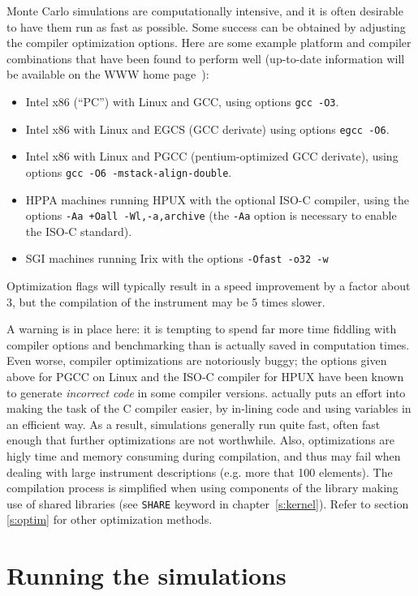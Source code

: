 Monte Carlo simulations are computationally intensive, and it is
often desirable to have them run as fast as possible. Some success can
be obtained by adjusting the compiler optimization
options. Here are some example platform and compiler combinations that
have been found to perform well (up-to-date information will be
available on the \MCS WWW home page~\cite{mcstas_webpage}):
\begin{itemize}
\item Intel x86 (``PC'') with Linux and GCC, using options \verb+gcc -O3+.
\item Intel x86 with Linux and EGCS (GCC derivate) using
  options \verb+egcc -O6+.
\item Intel x86 with Linux and PGCC (pentium-optimized GCC derivate), using
  options \verb+gcc -O6 -mstack-align-double+.
\item HPPA machines running HPUX with the optional ISO-C compiler,
  using the options
  \verb|-Aa +Oall -Wl,-a,archive| (the \verb+-Aa+ option is necessary to
  enable the ISO-C standard).
\item SGI machines running Irix with the options
  \verb|-Ofast -o32 -w|
\end{itemize}
Optimization flags will typically result in a speed improvement by a factor
about 3, but the compilation of the instrument may be 5 times slower.

A warning is in place here: it is tempting to spend far more time
fiddling with compiler options and benchmarking than is actually saved
in computation times. Even worse, compiler optimizations are notoriously
buggy; the options given above for PGCC on Linux and the ISO-C compiler
for HPUX have been known to generate \emph{incorrect code} in some
compiler versions. \MCS actually puts an effort into making the task of the C compiler
easier, by in-lining code and using variables in an efficient way. As a
result, \MCS simulations generally run quite fast, often fast enough
that further optimizations are not worthwhile. Also, optimizations are higly
time and memory consuming during compilation, and thus may fail when dealing
with large instrument descriptions (e.g. more that 100 elements). The compilation process is simplified when using components of the library making use of shared libraries (see \verb+SHARE+ keyword in chapter~\ref{s:kernel}). Refer to section \ref{s:optim} for other optimization methods.

\section{Running the simulations}
\label{s:run-sim}

